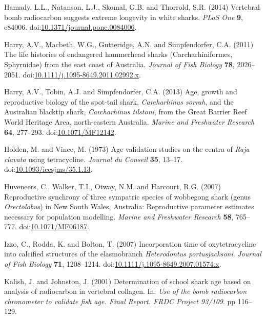 \documentclass[]{article}
\begin{document}
\hypertarget{ref-hamady_vertebral_2014}{}
Hamady, L.L., Natanson, L.J., Skomal, G.B. and Thorrold, S.R. (2014)
Vertebral bomb radiocarbon suggests extreme longevity in white sharks.
\emph{PLoS One} \textbf{9}, e84006.
doi:\href{https://doi.org/10.1371/journal.pone.0084006}{10.1371/journal.pone.0084006}.

\hypertarget{ref-harry_life_2011}{}
Harry, A.V., Macbeth, W.G., Gutteridge, A.N. and Simpfendorfer, C.A.
(2011) The life histories of endangered hammerhead sharks
(Carcharhiniformes, Sphyrnidae) from the east coast of Australia.
\emph{Journal of Fish Biology} \textbf{78}, 2026--2051.
doi:\href{https://doi.org/10.1111/j.1095-8649.2011.02992.x}{10.1111/j.1095-8649.2011.02992.x}.

\hypertarget{ref-harry_age_2013}{}
Harry, A.V., Tobin, A.J. and Simpfendorfer, C.A. (2013) Age, growth and
reproductive biology of the spot-tail shark, \emph{Carcharhinus sorrah},
and the Australian blacktip shark, \emph{Carcharhinus tilstoni}, from
the Great Barrier Reef World Heritage Area, north-eastern Australia.
\emph{Marine and Freshwater Research} \textbf{64}, 277--293.
doi:\href{https://doi.org/10.1071/MF12142}{10.1071/MF12142}.

\hypertarget{ref-holden_age_1973}{}
Holden, M. and Vince, M. (1973) Age validation studies on the centra of
\emph{Raja clavata} using tetracycline. \emph{Journal du Conseil}
\textbf{35}, 13--17.
doi:\href{https://doi.org/10.1093/icesjms/35.1.13}{10.1093/icesjms/35.1.13}.

\hypertarget{ref-huveneers_reproductive_2007}{}
Huveneers, C., Walker, T.I., Otway, N.M. and Harcourt, R.G. (2007)
Reproductive synchrony of three sympatric species of wobbegong shark
(genus \emph{Orectolobus}) in New South Wales, Australia: Reproductive
parameter estimates necessary for population modelling. \emph{Marine and
Freshwater Research} \textbf{58}, 765--777.
doi:\href{https://doi.org/10.1071/MF06187}{10.1071/MF06187}.

\hypertarget{ref-izzo_incorporation_2007}{}
Izzo, C., Rodda, K. and Bolton, T. (2007) Incorporation time of
oxytetracycline into calcified structures of the elasmobranch
\emph{Heterodontus portusjacksoni}. \emph{Journal of Fish Biology}
\textbf{71}, 1208--1214.
doi:\href{https://doi.org/10.1111/j.1095-8649.2007.01574.x}{10.1111/j.1095-8649.2007.01574.x}.

\hypertarget{ref-kalish_determination_2001}{}
Kalish, J. and Johnston, J. (2001) Determination of school shark age
based on analysis of radiocarbon in vertebral collagen. In: \emph{Use of
the bomb radiocarbon chronometer to validate fish age. Final Report.
FRDC Project 93/109}. pp 116--129.
\end{document}
